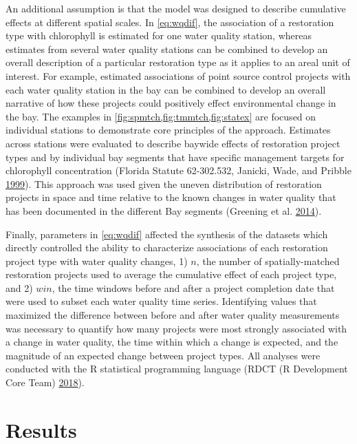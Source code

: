 \documentclass[]{article}
\begin{document}
An additional assumption is that the model was designed to describe
cumulative effects at different spatial scales. In \cref{eq:wqdif}, the
association of a restoration type with chlorophyll is estimated for one
water quality station, whereas estimates from several water quality
stations can be combined to develop an overall description of a
particular restoration type as it applies to an areal unit of interest.
For example, estimated associations of point source control projects
with each water quality station in the bay can be combined to develop an
overall narrative of how these projects could positively effect
environmental change in the bay. The examples in
\cref{fig:spmtch,fig:tmmtch,fig:statex} are focused on individual
stations to demonstrate core principles of the approach. Estimates
across stations were evaluated to describe baywide effects of
restoration project types and by individual bay segments that have
specific management targets for chlorophyll concentration (Florida
Statute 62-302.532, Janicki, Wade, and Pribble
\protect\hyperlink{ref-Janicki99}{1999}). This approach was used given
the uneven distribution of restoration projects in space and time
relative to the known changes in water quality that has been documented
in the different Bay segments (Greening et al.
\protect\hyperlink{ref-Greening2014}{2014}).

Finally, parameters in \cref{eq:wqdif} affected the synthesis of the
datasets which directly controlled the ability to characterize
associations of each restoration project type with water quality
changes, 1) \(n\), the number of spatially-matched restoration projects
used to average the cumulative effect of each project type, and 2)
\(win\), the time windows before and after a project completion date
that were used to subset each water quality time series. Identifying
values that maximized the difference between before and after water
quality measurements was necessary to quantify how many projects were
most strongly associated with a change in water quality, the time within
which a change is expected, and the magnitude of an expected change
between project types. All analyses were conducted with the R
statistical programming language (RDCT (R Development Core Team)
\protect\hyperlink{ref-RDCT18}{2018}).

\hypertarget{results}{%
\section{Results}\label{results}}
\end{document}
